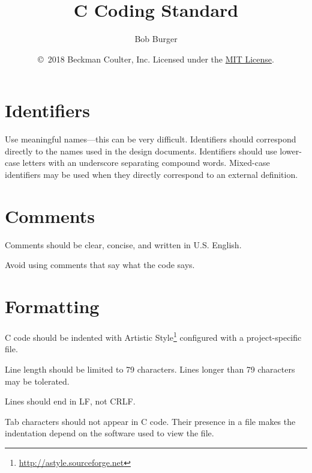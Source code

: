 \documentclass[letterpaper,11pt,twoside,final]{article}
\begin{document}
\title {C Coding Standard}
\author {Bob Burger}
\date {\copyright\ 2018 Beckman Coulter, Inc.
  Licensed under the \href{https://opensource.org/licenses/MIT}{MIT License}.}
\coverpage

\section* {Identifiers}

Use meaningful names---this can be very difficult. Identifiers should
correspond directly to the names used in the design
documents. Identifiers should use lower-case letters with an
underscore separating compound words. Mixed-case identifiers may be
used when they directly correspond to an external definition.

\section* {Comments}

Comments should be clear, concise, and written in U.S. English.

Avoid using comments that say what the code says.

\section* {Formatting}

C code should be indented with Artistic
Style\footnote{\url{http://astyle.sourceforge.net}} configured with a
project-specific  file.

Line length should be limited to 79 characters. Lines longer than 79
characters may be tolerated.

Lines should end in LF, not CRLF.

Tab characters should not appear in C code. Their presence in a file
makes the indentation depend on the software used to view the file.
\end{document}
